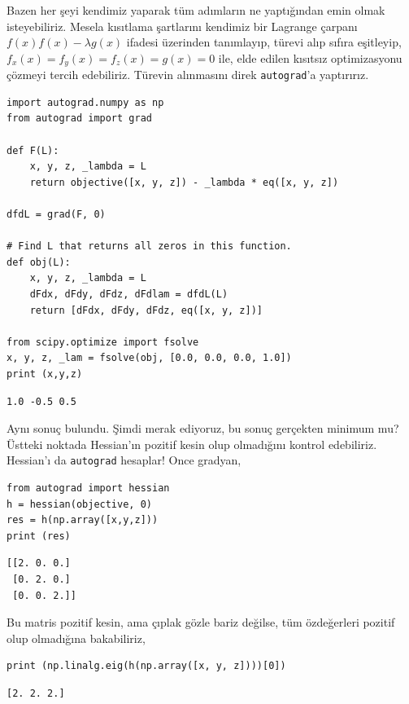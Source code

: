 \documentclass[12pt,fleqn]{article}\usepackage{../../common}
\begin{document}
Bazen her şeyi kendimiz yaparak tüm adımların ne yaptığından emin olmak
isteyebiliriz. Mesela kısıtlama şartlarını kendimiz bir Lagrange çarpanı
$f(x) f(x) - \lambda g(x)$ ifadesi üzerinden tanımlayıp, türevi alıp sıfıra
eşitleyip, $f_x(x)=f_y(x)=f_z(x)=g(x)=0$ ile, elde edilen kısıtsız
optimizasyonu çözmeyi tercih edebiliriz. Türevin alınmasını direk
\verb!autograd!'a yaptırırız.

\begin{verbatim}
import autograd.numpy as np
from autograd import grad

def F(L):
    x, y, z, _lambda = L
    return objective([x, y, z]) - _lambda * eq([x, y, z])

dfdL = grad(F, 0)

# Find L that returns all zeros in this function.
def obj(L):
    x, y, z, _lambda = L
    dFdx, dFdy, dFdz, dFdlam = dfdL(L)
    return [dFdx, dFdy, dFdz, eq([x, y, z])]

from scipy.optimize import fsolve
x, y, z, _lam = fsolve(obj, [0.0, 0.0, 0.0, 1.0])
print (x,y,z)
\end{verbatim}

\begin{verbatim}
1.0 -0.5 0.5
\end{verbatim}

Aynı sonuç bulundu. Şimdi merak ediyoruz, bu sonuç gerçekten minimum mu?
Üstteki noktada Hessian'ın pozitif kesin olup olmadığını kontrol
edebiliriz. Hessian'ı da \verb!autograd! hesaplar! Once gradyan,

\begin{verbatim}
from autograd import hessian
h = hessian(objective, 0)
res = h(np.array([x,y,z]))
print (res)
\end{verbatim}

\begin{verbatim}
[[2. 0. 0.]
 [0. 2. 0.]
 [0. 0. 2.]]
\end{verbatim}

Bu matris pozitif kesin, ama çıplak gözle bariz değilse, tüm özdeğerleri
pozitif olup olmadığına bakabiliriz, 

\begin{verbatim}
print (np.linalg.eig(h(np.array([x, y, z])))[0])
\end{verbatim}

\begin{verbatim}
[2. 2. 2.]
\end{verbatim}
\end{document}
